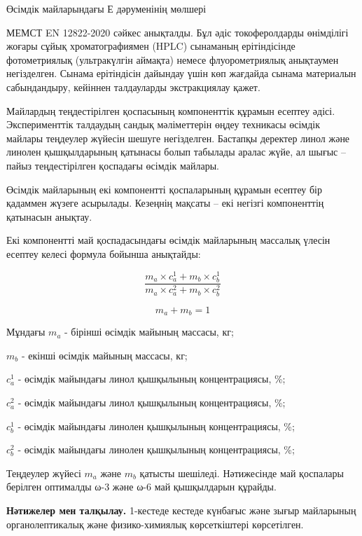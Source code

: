 \begin{multicols}{2}
Өсімдік майларындағы Е дәруменінің мөлшері

МЕМСТ EN 12822-2020 сәйкес анықталды. Бұл әдіс токоферолдарды өнімділігі
жоғары сұйық хроматографиямен (HPLC) сынаманың ерітіндісінде
фотометриялық (ультракүлгін аймақта) немесе флуорометриялық анықтаумен
негізделген. Сынама ерітіндісін дайындау үшін көп жағдайда сынама
материалын сабындандыру, кейіннен талдауларды экстракциялау қажет.

Майлардың теңдестірілген қоспасының компоненттік құрамын есептеу әдісі.
Эксперименттік талдаудың сандық мәліметтерін өңдеу техникасы өсімдік
майлары теңдеулер жүйесін шешуге негізделген. Бастапқы деректер линол
және линолен қышқылдарының қатынасы болып табылады аралас жүйе, ал шығыс
-- пайыз теңдестірілген қоспадағы өсімдік майлары.

Өсімдік майларының екі компонентті қоспаларының құрамын есептеу бір
қадаммен жүзеге асырылады. Кезеңнің мақсаты -- екі негізгі компоненттің
қатынасын анықтау.

Екі компонентті май қоспадасындағы өсімдік майларының массалық үлесін
есептеу келесі формула бойынша анықтайды:

\begin{equation}
\frac{m_{a} \times c_{a}^{1} + m_{b} \times c_{b}^{1}}{m_{a} \times c_{a}^{2} + m_{b} \times c_{b}^{2}}
\end{equation}

\begin{equation*}
m_a+m_b=1
\end{equation*}

Мұндағы \(m_{a}\) - бірінші өсімдік майының массасы, кг;

\(m_{b}\) - екінші өсімдік майының массасы, кг;

\(c_{a}^{1}\) - өсімдік майындағы линол қышқылының концентрациясы, \%;

\(c_{a}^{2}\) - өсімдік майындағы линол қышқылының
концентрациясы, \%;

\(c_{b}^{1}\) - өсімдік майындағы линолен қышқылының концентрациясы, \%;

\(c_{b}^{2}\) - өсімдік майындағы линолен қышқылының
концентрациясы, \%;

Теңдеулер жүйесі \(m_{a}\) және \(m_{b}\) қатысты шешіледі. Нәтижесінде
май қоспалары берілген оптималды ω-3 және ω-6 май қышқылдарын құрайды.

{\bfseries Нәтижелер мен талқылау.} 1-кестеде кестеде күнбағыс және зығыр
майларының органолептикалық және физико-химиялық көрсеткіштері
көрсетілген.
\end{multicols}


